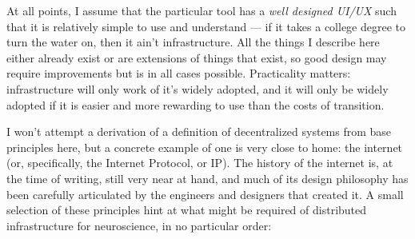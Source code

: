 \documentclass{article}
\begin{document}
At all points, I assume that the particular tool has a \emph{well
designed UI/UX} such that it is relatively simple to use and understand
--- if it takes a college degree to turn the water on, then it ain't
infrastructure. All the things I describe here either already exist or
are extensions of things that exist, so good design may require
improvements but is in all cases possible. Practicality matters:
infrastructure will only work of it's widely adopted, and it will only
be widely adopted if it is easier and more rewarding to use than the
costs of transition.

I won't attempt a derivation of a definition of decentralized systems
from base principles here, but a concrete example of one is very close
to home: the internet (or, specifically, the Internet Protocol, or IP).
The history of the internet is, at the time of writing, still very near
at hand, and much of its design philosophy has been carefully
articulated by the engineers and designers that created it. A small
selection of these principles hint at what might be required of
distributed infrastructure for neuroscience, in no particular order:
\end{document}
